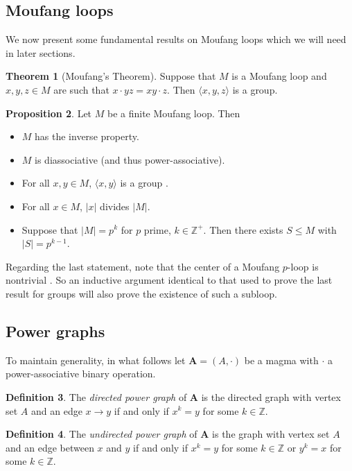 \documentclass[12pt]{report}
\theoremstyle{definition}
\newtheorem{thm}{Theorem}[chapter]
\newtheorem{prp}[thm]{Proposition}
\newtheorem{dfn}[thm]{Definition}
\newcommand{\ZZZ}{\mathbb{Z}}
\begin{document}
\subsection{Moufang loops}

We now present some fundamental results on Moufang loops which we will need in later sections.

\begin{thm}[Moufang's Theorem]
  Suppose that $M$ is a Moufang loop and $x, y, z\in M$ are such that $x\cdot yz = xy\cdot z$.
    Then $\langle x, y, z\rangle$ is a group.
\end{thm}

\begin{prp}\label{gen-facts}
	Let $M$ be a finite Moufang loop. Then
    \begin{itemize}
        \item $M$ has the inverse property.
        \item $M$ is diassociative (and thus power-associative).
        \item For all $x, y\in M$, $\langle x, y\rangle$ is a group \cite{Moufang}.
  	    \item For all $x\in M$, $|x|$ divides $|M|$.
        \item Suppose that $|M| = p^k$ for $p$ prime, $k\in\ZZZ^+$. Then there exists $S\leq M$ with $|S| = p^{k - 1}$.
    \end{itemize}
\end{prp}

Regarding the last statement, note that the center of a Moufang $p$-loop is nontrivial \cite{2-loops} \cite{Glau}.
  So an inductive argument identical to that used to prove the last result for groups will also prove the existence
  of such a subloop.

\subsection{Power graphs}

To maintain generality, in what follows let $\textbf{A} = (A, \cdot)$ be a magma with $\cdot$ a power-associative
  binary operation.

\begin{dfn}
	The \textit{directed power graph} of \textbf{A} is the directed graph with vertex set $A$ and an edge $x\to y$
    if and only if $x^k = y$ for some $k\in\mathbb{Z}$.
\end{dfn}

\begin{dfn}
	The \textit{undirected power graph} of \textbf{A} is the graph with vertex set $A$ and an edge between $x$
    and $y$ if and only if $x^k = y$ for some $k\in \mathbb{Z}$ or $y^k = x$ for some $k\in\mathbb{Z}$.
\end{dfn}
\end{document}
